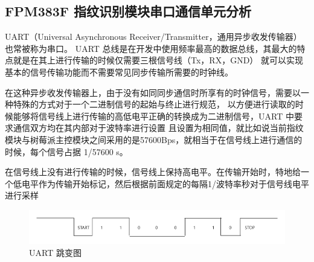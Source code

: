 
    \subsection{FPM383F 指纹识别模块串口通信单元分析}

    UART（Universal Asynchronous Receiver/Transmitter，通用异步收发传输器）也常被称为串口。
    UART 总线是在开发中使用频率最高的数据总线，其最大的特点就是在其上进行传输的时候仅需要三根信号线（Tx，RX，GND）
    就可以实现基本的信号传输功能而不需要常见同步传输所需要的时钟线。

    在这种异步收发传输器上，由于没有如同同步通信时所享有的时钟信号，需要以一种特殊的方式对于一个二进制信号的起始与终止进行规范，
    以方便进行读取的时候能够将信号线上进行传输的高低电平正确的转换成为二进制信号，UART 中要求通信双方均在其内部对于波特率进行设置
    且设置为相同值，就比如说当前指纹模块与树莓派主控模块之间采用的是57600Bps，就相当于在信号线上进行通信的时候，每个信号占据 1/57600 s。

    在信号线上没有进行传输的时候，信号线上保持高电平。在传输开始时，特地给一个低电平作为传输开始标记，然后根据前面规定的每隔1/波特率秒对于信号线电平进行采样
    

    \begin{figure}[ht]
        \centering
        \includegraphics[scale=0.4]{imgs/UART跳变图.png}
        \caption{UART 跳变图}    \label{fig::uart}
    \end{figure}






